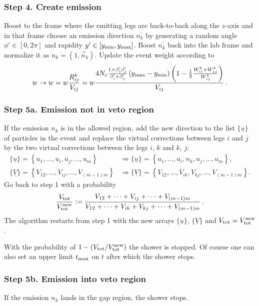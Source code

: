 \documentclass[11pt,a4paper]{article}
\begin{document}
\subsubsection*{Step 4. Create emission}
Boost to the frame where the emitting legs are back-to-back along the $z$-axis and in that frame choose an emission direction $n_k^\prime$ by generating a random angle $\phi' \in [0,2\pi]$  and rapidity $y' \in [y_{{\rm min}},y_{{\rm max}}]$. Boost $n_k^\prime$ back into the lab frame and normalize it as $n_k=(1,\vec{n}_k)$. Update the event weight according to
\begin{equation}
w\rightarrow w=w \frac{R_{ij}^k}{V_{ij}}=w \frac{4 N_c \frac{1+\beta_i^\prime \beta_j^\prime}{\beta_i^\prime+\beta_j^\prime}\left(y_{{\rm max}}-y_{{\rm min}}\right)\left(1-\frac{1}{2}\frac{W_{ii}^k+W_{jj}^k}{W_{ij}^k}\right)}{V_{ij}}\, .
\end{equation}


\subsubsection*{Step 5a. Emission not in veto region}
If the emission $n_k$ is in the allowed region, add the new direction to the list $\{\underline{u}\}$ of particles in the event and replace the virtual corrections between legs $i$ and $j$ by the two virtual corrections between the legs $i$, $k$ and $k$, $j$:
\begin{align}
\{\underline{u}\}=\left\{u_1,\dots,u_i,u_j,\dots,u_m\right\}&\Rightarrow \{\underline{u}\}=\left\{u_1,\dots,u_i,n_k,u_j,\dots,u_m\right\}  , \nonumber \\
\{\underline{V}\}=\left\{V_{12},\dots,V_{ij},\dots,V_{(m-1)m}\right\}&\Rightarrow \{\underline{V}\}=\left\{V_{12},\dots,V_{ik},V_{kj},\dots,V_{(m-1)m}\right\}.
\end{align}
Go back to step 1 with a probability
\begin{align}
\frac{V_{{\rm tot}}}{V_{{\rm tot}}^{{\rm new}}}:=\frac{V_{12}+\dots+V_{ij}+\dots+V_{(m-1)m}}{V_{12}+\dots+V_{ik}+V_{kj}+\dots+V_{(m-1)m}}\, .
\end{align}
The algorithm restarts from step 1 with the new arrays $\{\underline{u}\}$, $\{\underline{V}\}$ and $V_{{\rm tot}}=V_{{\rm tot}}^{{\rm new}}$.

With the probability of $1-({V_{{\rm tot}}}/{V_{{\rm tot}}^{{\rm new}}})$ the shower is stopped. Of course one can also set an upper limit $t_{\rm max}$ on $t$ after which the shower stops.

\subsubsection*{Step 5b. Emission into veto region}
If the emission $n_k$ lands in the gap region, the shower stops.
\end{document}
